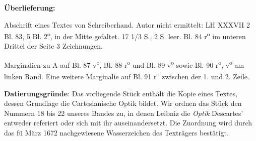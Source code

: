       
               
                \begin{ledgroupsized}[r]{120mm}
                \footnotesize 
                \pstart                
                \noindent\textbf{\"{U}berlieferung:}   
                \pend
                \end{ledgroupsized}
            
              
                            \begin{ledgroupsized}[r]{114mm}
                            \footnotesize 
                            \pstart \parindent -6mm
                            Abschrift eines Textes von Schreiberhand. Autor nicht ermittelt: LH XXXVII 2 Bl. 83, 5 Bl. 2\textsuperscript{o}, in der Mitte gefaltet. 17 1/3 S., 2 S. leer. Bl. 84 r\textsuperscript{o} im unteren Drittel der Seite 3 Zeichnungen. \pend
                            \end{ledgroupsized}
              
                            \begin{ledgroupsized}[r]{114mm}
                            \footnotesize 
                            \pstart \parindent -6mm
                            Marginalien zu A auf Bl. 87 v\textsuperscript{o}, Bl. 88 r\textsuperscript{o} und Bl. 89 v\textsuperscript{o} sowie Bl. 90 r\textsuperscript{o}, v\textsuperscript{o} am linken Rand. Eine weitere Marginalie auf Bl. 91 r\textsuperscript{o} zwischen der 1. und 2. Zeile. \pend
                            \end{ledgroupsized}
                \vspace*{5mm}
                \begin{ledgroup}
                \footnotesize 
                \pstart
            \noindent\footnotesize{\textbf{Datierungsgr\"{u}nde}: Das vorliegende St\"{u}ck enth\"{a}lt die Kopie eines Textes, dessen Grundlage die Cartesianische Optik bildet. Wir ordnen das St\"{u}ck den Nummern 18 bis 22 unseres Bandes zu, in denen Leibniz die \cite{00038}\textit{Optik} Descartes' entweder referiert oder sich mit ihr auseinandersetzt. Die Zuordnung wird durch das f\"{u} M\"{a}rz 1672 nachgewiesene Wasserzeichen des Textr\"{a}gers best\"{a}tigt.}
                \pend
                \end{ledgroup}
            
